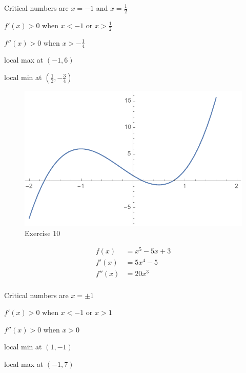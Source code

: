 \documentclass[letterpaper, landscape]{exam}
\begin{document}
\begin{description}
      \begin{itemize*}
        \item Critical numbers are $x = -1$ and $x = \frac{1}{2}$ 
        \item $f'(x) > 0$ when $x < -1$ or $x > \frac{1}{2}$
        \item $f''(x) > 0$ when $x > - \frac{1}{4}$ 
        \item local max at $(-1, 6)$
        \item local min at $\left( \frac{1}{2}, - \frac{3}{4} \right)$
      \end{itemize*}

      \begin{figure}[H]
        \centering
        \includegraphics[scale = 0.6]{ex43_10.pdf}
        \caption{Exercise 10}
        \label{fig:ex_4.3_10}
      \end{figure}

    \newpage

    \item[19]
      \begin{align*}
        f(x)   & = x^5 - 5x + 3 \\
        f'(x)  & = 5x^4 -5 \\
        f''(x) & = 20x^3 \\
      \end{align*}

      \begin{itemize*}
        \item Critical numbers are $x = \pm 1$ 
        \item $f'(x) > 0$ when $x < -1$ or $x > 1$
        \item $f''(x) > 0$ when $x > 0$
        \item local min at $(1, -1)$
        \item local max at $(-1, 7)$
      \end{itemize*}


\end{description}
\end{document}
